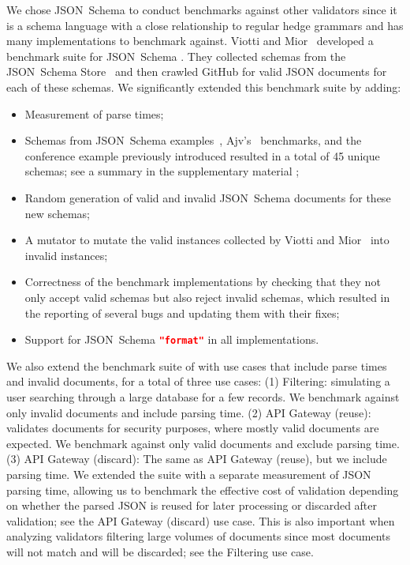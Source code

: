 \documentclass[runningheads]{llncs}
\newcommand{\JSONSchema}{%
  JSON~Schema\xspace%
}
\newcommand{\supplementarymaterial}{%
  supplementary material\xspace%
}
\newcommand{\GitHub}{%
  GitHub\xspace%
}
\newcommand{\format}{%
  \lstinline[language=json]|"format"|\xspace%
}
\newcommand{\JSON}{\ac{JSON}\xspace}
\begin{document}
We chose \JSONSchema to conduct benchmarks against other validators since it is a schema language with a close relationship to regular hedge grammars and has many implementations to benchmark against.
Viotti and Mior~\cite{blaze} developed a benchmark suite for \JSONSchema.
They collected schemas from the \JSONSchema Store~\cite{schemastore} and then crawled \GitHub for valid \JSON documents for each of these schemas.
We significantly extended this benchmark suite by adding:
\begin{itemize}
\item Measurement of parse times;
\item Schemas from \JSONSchema examples~\cite{jsonschemaexamples}, Ajv's~\cite{jsonschema_impl_ajv} benchmarks, and the conference example previously introduced resulted in a total of 45 unique schemas; see a summary in the \supplementarymaterial;
\item Random generation of valid and invalid \JSONSchema documents for these new schemas;
\item A mutator to mutate the valid instances collected by Viotti and Mior~\cite{blaze} into invalid instances;
\item Correctness of the benchmark implementations by checking that they not only accept valid schemas but also reject invalid schemas, which resulted in the reporting of several bugs and updating them with their fixes;
\item Support for \JSONSchema \format in all implementations.
\end{itemize}
We also extend the benchmark suite of \cite{blaze} with use cases that include parse times and invalid documents, for a total of three use cases: (1) Filtering: simulating a user searching through a large database for a few records. We benchmark against only invalid documents and include parsing time.
(2) API Gateway (reuse): validates documents for security purposes, where mostly valid documents are expected. We benchmark against only valid documents and exclude parsing time.
(3) API Gateway (discard): The same as API Gateway (reuse), but we include parsing time.
We extended the suite with a separate measurement of \JSON parsing time, allowing us to benchmark the effective cost of validation depending on whether the parsed \JSON is reused for later processing or discarded after validation; see the API Gateway (discard) use case.
This is also important when analyzing validators filtering large volumes of documents since most documents will not match and will be discarded; see the Filtering use case. 
\end{document}
